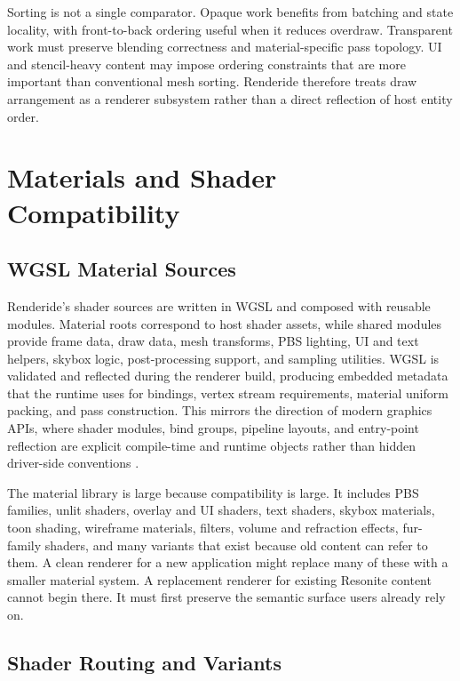 \documentclass[acmtog,screen,nonacm]{acmart}
\begin{document}
Sorting is not a single comparator. Opaque work benefits from batching and state locality, with front-to-back ordering useful when it reduces overdraw. Transparent work must preserve blending correctness and material-specific pass topology. UI and stencil-heavy content may impose ordering constraints that are more important than conventional mesh sorting. Renderide therefore treats draw arrangement as a renderer subsystem rather than a direct reflection of host entity order.

\section{Materials and Shader Compatibility}

\subsection{WGSL Material Sources}

Renderide's shader sources are written in WGSL and composed with reusable modules. Material roots correspond to host shader assets, while shared modules provide frame data, draw data, mesh transforms, PBS lighting, UI and text helpers, skybox logic, post-processing support, and sampling utilities. WGSL is validated and reflected during the renderer build, producing embedded metadata that the runtime uses for bindings, vertex stream requirements, material uniform packing, and pass construction. This mirrors the direction of modern graphics APIs, where shader modules, bind groups, pipeline layouts, and entry-point reflection are explicit compile-time and runtime objects rather than hidden driver-side conventions \citep{webgpuSpec,wgslSpec,wgpuDocs}.

The material library is large because compatibility is large. It includes PBS families, unlit shaders, overlay and UI shaders, text shaders, skybox materials, toon shading, wireframe materials, filters, volume and refraction effects, fur-family shaders, and many variants that exist because old content can refer to them. A clean renderer for a new application might replace many of these with a smaller material system. A replacement renderer for existing Resonite content cannot begin there. It must first preserve the semantic surface users already rely on.

\subsection{Shader Routing and Variants}
\end{document}
